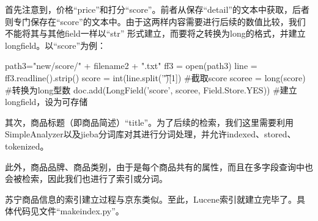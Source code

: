 首先注意到，价格“price”和打分“score”。前者从保存“detail”的文本中获取，后者则专门保存在“score”的文本中。由于这两样内容需要进行后续的数值比较，我们不能将其与其他field一样以“str” 形式建立，而要将之转换为long的格式，并建立longfield。以“score”为例：

\begin{python}
path3="new/score/" + filename2 + ".txt"
ff3 = open(path3)
line = ff3.readline().strip()
score = int(line.split('\t')[1])        #截取score
scoree = long(score)                    #转换为long型数
doc.add(LongField('score', scoree, Field.Store.YES)) #建立longfield，设为可存储
\end{python}


其次，商品标题（即商品简述）“title”。为了后续的检索，我们这里需要利用SimpleAnalyzer以及jieba分词库对其进行分词处理，并允许indexed、stored、tokenized。

此外，商品品牌、商品类别，由于是每个商品共有的属性，而且在多字段查询中也会被检索，因此我们也进行了索引或分词。

苏宁商品信息的索引建立过程与京东类似。至此，Lucene索引就建立完毕了。具体代码见文件“makeindex.py”。
